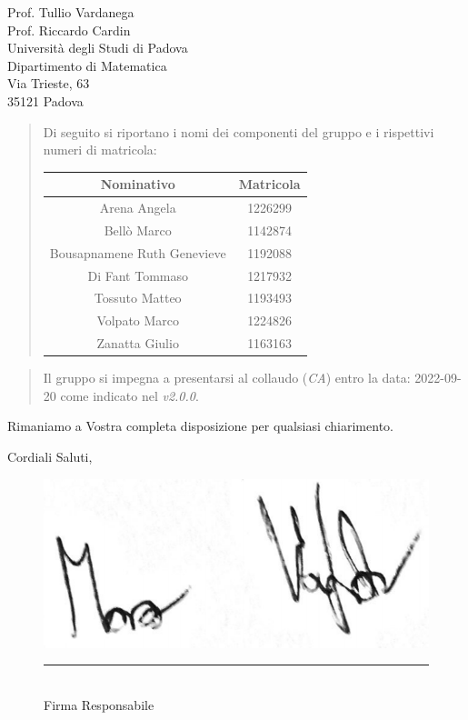\documentclass{articoletteracdp}
\begin{document}
\begin{letter}{
			Prof. Tullio Vardanega \\
			Prof. Riccardo Cardin \\
			Università degli Studi di Padova \\
			Dipartimento di Matematica \\
			Via Trieste, 63 \\
			35121 Padova
		}
		\newpage

        \begin{quotation}
			\noindent
			Di seguito si riportano i nomi dei componenti del gruppo e i rispettivi numeri di matricola:

				\begin{center}
					\setlength{\extrarowheight}{.75ex}
					\begin{tabular}{ c | c }
						\textbf{Nominativo}           & \textbf{Matricola} \\
						\hline

						Arena Angela{}                & 1226299{}          \\
						Bellò Marco{}                 & 1142874{}          \\
						Bousapnamene Ruth Genevieve{} & 1192088{}          \\
						Di Fant Tommaso{}             & 1217932{}          \\
						Tossuto Matteo{}              & 1193493{}          \\
						Volpato Marco{}               & 1224826{}          \\
						Zanatta Giulio{}              & 1163163{}          \\

						\hline
					\end{tabular}
				\end{center}
			
		\end{quotation}

		\begin{quotation}
			\noindent
			Il gruppo si impegna a presentarsi al collaudo (\textit{CA}) entro la data:
			2022-09-20 come indicato nel \PdP{} \textit{v2.0.0}.
		\end{quotation}

		\vspace{0.5cm}
		Rimaniamo a Vostra completa disposizione per qualsiasi chiarimento.

		\vspace{0.5cm}
		\closing{ Cordiali Saluti,}
		\begin{figure}[!h]
			\begin{flushright}
				\includegraphics[width=0.2\linewidth]{sezioni/firma_mv.png}
			\end{flushright}
			\begin{flushright}
				\rule{100pt}{0.1pt}\\
				Firma Responsabile
			\end{flushright}
		\end{figure}
	\end{letter}
\end{document}
